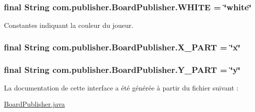 \hypertarget{interfacecom_1_1publisher_1_1BoardPublisher_a4cc34fc55d558d4d567bb4835faca1cb}{
\subsubsection[{W\-H\-I\-T\-E}]{\setlength{\rightskip}{0pt plus 5cm}final String com.\-publisher.\-Board\-Publisher.\-W\-H\-I\-T\-E = \char`\"{}white\char`\"{}\hspace{0.3cm}{\ttfamily [static]}}}\label{interfacecom_1_1publisher_1_1BoardPublisher_a4cc34fc55d558d4d567bb4835faca1cb}
Constantes indiquant la couleur du joueur. \hypertarget{interfacecom_1_1publisher_1_1BoardPublisher_a2b1aa577a5813b50376be3b43b673871}{
\subsubsection[{X\-\_\-\-P\-A\-R\-T}]{\setlength{\rightskip}{0pt plus 5cm}final String com.\-publisher.\-Board\-Publisher.\-X\-\_\-\-P\-A\-R\-T = \char`\"{}x\char`\"{}\hspace{0.3cm}{\ttfamily [static]}}}\label{interfacecom_1_1publisher_1_1BoardPublisher_a2b1aa577a5813b50376be3b43b673871}
\hypertarget{interfacecom_1_1publisher_1_1BoardPublisher_a9a0cac8873d240fbeac51b8b9d63c989}{
\subsubsection[{Y\-\_\-\-P\-A\-R\-T}]{\setlength{\rightskip}{0pt plus 5cm}final String com.\-publisher.\-Board\-Publisher.\-Y\-\_\-\-P\-A\-R\-T = \char`\"{}y\char`\"{}\hspace{0.3cm}{\ttfamily [static]}}}\label{interfacecom_1_1publisher_1_1BoardPublisher_a9a0cac8873d240fbeac51b8b9d63c989}


La documentation de cette interface a été générée à partir du fichier suivant \-:\begin{DoxyCompactItemize}
\item 
\hyperlink{BoardPublisher_8java}{Board\-Publisher.\-java}\end{DoxyCompactItemize}
